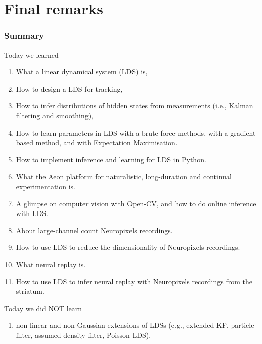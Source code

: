 \section{Final remarks}

\begin{frame}
    \frametitle{Summary}
    Today we learned

    \begin{enumerate}

        \item What a linear dynamical system (LDS) is,

        \item How to design a LDS for tracking,

        \item How to infer distributions of hidden states from measurements
            (i.e., Kalman filtering and smoothing),

        \item How to learn parameters in LDS with a brute force methods, with a
            gradient-based method, and with Expectation Maximisation.

        \item How to implement inference and learning for LDS in Python.

        \item What the Aeon platform for naturalistic, long-duration and
            continual experimentation is.

        \item A glimpse on computer vision with Open-CV, and how to do online
            inference with LDS.

        \item About large-channel count Neuropixels recordings.

        \item How to use LDS to reduce the dimensionality of Neuropixels
            recordings.

        \item What neural replay is.

        \item How to use LDS to infer neural replay with Neuropixels recordings
            from the striatum.
    \end{enumerate}

     {
    Today we did NOT learn

    \begin{enumerate}

        \item non-linear and non-Gaussian extensions of LDSs (e.g., extended KF,
            particle filter, assumed density filter, Poisson LDS).

    \end{enumerate}
    }

\end{frame}

